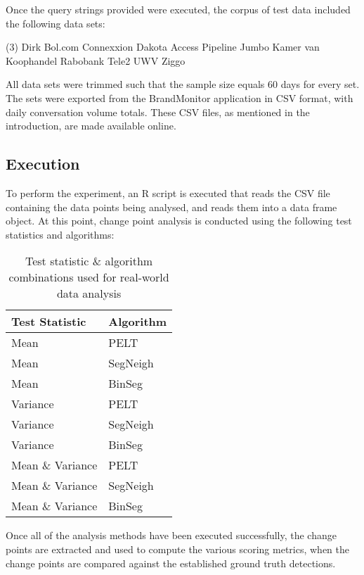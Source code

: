 \documentclass[../main.tex]{subfiles}
\begin{document}
Once the query strings provided were executed, the corpus of test data included the following data sets:

\begin{tasks}[label=$\bullet$](3)
\task Dirk
\task Bol.com
\task Connexxion
\task Dakota Access Pipeline
\task Jumbo
\task Kamer van Koophandel
\task Rabobank
\task Tele2
\task UWV
\task Ziggo 
\end{tasks}

All data sets were trimmed such that the sample size equals 60 days for every set. The sets were exported from the BrandMonitor application in CSV format, with daily conversation volume totals. These CSV files, as mentioned in the introduction, are made available online.

\subsection{Execution}

To perform the experiment, an \textsf{R} script is executed that reads the CSV file containing the data points being analysed, and reads them into a data frame object. At this point, change point analysis is conducted using the following test statistics and algorithms:

\begin{table}[h]
\centering
\begin{tabular}{@{}ll@{}}
\toprule
\textbf{Test Statistic} & \textbf{Algorithm} \\ \midrule
Mean & PELT \\
Mean & SegNeigh \\
Mean & BinSeg \\
Variance & PELT \\
Variance & SegNeigh \\
Variance & BinSeg \\
Mean \& Variance & PELT \\
Mean \& Variance & SegNeigh \\
Mean \& Variance & BinSeg \\ \bottomrule
\end{tabular}
\caption{Test statistic \& algorithm combinations used for real-world data analysis}
\end{table}

Once all of the analysis methods have been executed successfully, the change points are extracted and used to compute the various scoring metrics, when the change points are compared against the established ground truth detections.
\end{document}
